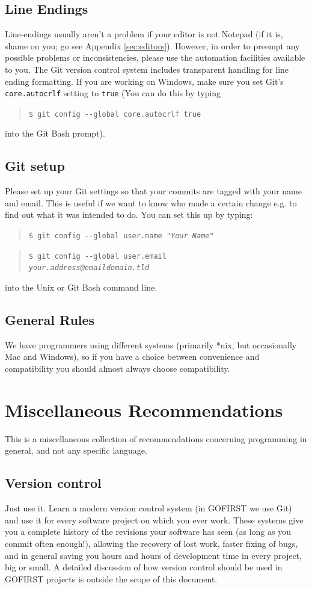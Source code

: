 \documentclass[12pt]{article}
\newcommand{\var}[1]{\texttt{#1}}
\newcommand{\commandline}[1]{\begin{quotation}\texttt{\$ #1}\end{quotation}}
\newcommand{\clloption}[1]{-{}-#1}
\newcommand{\toreplace}[1]{\emph{#1}}
\begin{document}
\subsection{Line Endings} Line-endings usually aren't a problem if your editor is not Notepad (if it is, shame on you; go see Appendix \ref{sec:editors}). However, in order to preempt any possible problems or inconsistencies, please use the automation facilities available to you. The Git version control system includes transparent handling for line ending formatting. If you are working on Windows, make sure you set Git's \var{core.autocrlf} setting to \var{true} (You can do this by typing \commandline{git config \clloption{global} core.autocrlf true} into the Git Bash prompt).

\subsection{Git setup} Please set up your Git settings so that your commits are tagged with your name and email. This is useful if we want to know who made a certain change e.g. to find out what it was intended to do. You can set this up by typing:
        \commandline{git config \clloption{global} user.name "\toreplace{Your Name}"}
        \commandline{git config \clloption{global} user.email\\
        \toreplace{your.address@emaildomain.tld}}
into the Unix or Git Bash command line.

\subsection{General Rules} We have programmers using different systems (primarily *nix, but occasionally Mac and Windows), so if you have a choice between convenience and compatibility you should almost always choose compatibility.

\section{Miscellaneous Recommendations}
This is a miscellaneous collection of recommendations concerning programming in general, and not any specific language.

\subsection{Version control}
Just use it. Learn a modern version control system (in GOFIRST we use Git) and use it for every software project on which you ever work. These systems give you a complete history of the revisions your software has seen (as long as you commit often enough!), allowing the recovery of lost work, faster fixing of bugs, and in general saving you hours and hours of development time in every project, big or small. A detailed discussion of how version control should be used in GOFIRST projects is outside the scope of this document.
\end{document}
